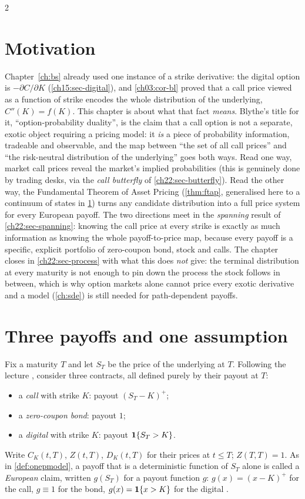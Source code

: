 \begin{paracol}{2}
\section*{Motivation}
Chapter~\ref{ch:bs} already used one instance of a strike derivative: the digital option is
$-\partial C/\partial K$ (\cref{ch15:sec-digital}), and \cref{ch03:cor-bl} proved that a call price
viewed as a function of strike encodes the whole distribution of the underlying, $C''(K)=f(K)$. This
chapter is about what that fact \emph{means}. Blythe's title for it, ``option-probability duality'',
is the claim that a call option is not a separate, exotic object requiring a pricing model: it
\emph{is} a piece of probability information, tradeable and observable, and the map between ``the set
of all call prices'' and ``the risk-neutral distribution of the underlying'' goes both ways. Read one
way, market call prices reveal the market's implied probabilities (this is genuinely done by trading
desks, via the \emph{call butterfly} of \cref{ch22:sec-butterfly}). Read the other way, the Fundamental
Theorem of Asset Pricing (\cref{thm:ftap}, generalised here to a continuum of states in
\cref{ch22:sec-ftap}) turns any candidate distribution into a full price system for every European
payoff. The two directions meet in the \emph{spanning} result of \cref{ch22:sec-spanning}: knowing the
call price at every strike is exactly as much information as knowing the whole payoff-to-price map,
because every payoff is a specific, explicit portfolio of zero-coupon bond, stock and calls. The
chapter closes in \cref{ch22:sec-process} with what this does \emph{not} give: the terminal
distribution at every maturity is not enough to pin down the process the stock follows in between,
which is why option markets alone cannot price every exotic derivative and a model (\cref{ch:sde}) is
still needed for path-dependent payoffs.

\section{Three payoffs and one assumption}\label{ch22:sec-ftap}

Fix a maturity $T$ and let $S_T$ be the price of the underlying at $T$. Following the lecture
, consider three contracts, all defined purely by their payout at $T$:
\begin{itemize}
  \item a \emph{call} with strike $K$: payout $(S_T-K)^+$;
  \item a \emph{zero-coupon bond}: payout $1$;
  \item a \emph{digital} with strike $K$: payout $\mathbf{1}\{S_T>K\}$.
\end{itemize}
Write $C_K(t,T)$, $Z(t,T)$, $D_K(t,T)$ for their prices at $t\le T$; $Z(T,T)=1$. As in
\cref{def:onepmodel}, a payoff that is a deterministic function of $S_T$ alone is called a
\emph{European} claim, written $g(S_T)$ for a payout function $g$: $g(x)=(x-K)^+$ for the call,
$g\equiv1$ for the bond, $g(x)=\mathbf{1}\{x>K\}$ for the digital .


\end{paracol}
